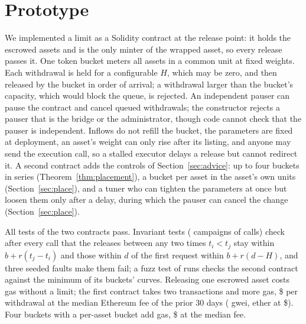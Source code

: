 \documentclass[conference,compsoc]{IEEEtran}
\numberwithin{equation}{section}
\theoremstyle{plain}
\theoremstyle{definition}
\theoremstyle{remark}
\begin{document}
\section{Prototype}\label{sec:prototype}

We implemented a limit as a Solidity contract at the release point: it holds the escrowed assets and is the only minter of the wrapped asset, so every release passes it. One token bucket meters all assets in a common unit at fixed weights. Each withdrawal is held for a configurable $H$, which may be zero, and then released by the bucket in order of arrival; a withdrawal larger than the bucket's capacity, which would block the queue, is rejected. An independent pauser can pause the contract and cancel queued withdrawals; the constructor rejects a pauser that is the bridge or the administrator, though code cannot check that the pauser is independent. Inflows do not refill the bucket, the parameters are fixed at deployment, an asset's weight can only rise after its listing, and anyone may send the execution call, so a stalled executor delays a release but cannot redirect it. A second contract adds the controls of Section~\ref{sec:advice}: up to four buckets in series (Theorem~\ref{thm:placement}), a bucket per asset in the asset's own units (Section~\ref{sec:place}), and a tuner who can tighten the parameters at once but loosen them only after a delay, during which the pauser can cancel the change (Section~\ref{sec:place}).

All \nTests{} tests of the two contracts pass. Invariant tests (\invRuns{} campaigns of \invDepth{} calls) check after every call that the releases between any two times $t_i < t_j$ stay within $b + r(t_j - t_i)$ and those within $d$ of the first request within $b + r(d - H)$, and three seeded faults make them fail; a fuzz test of \nFuzzRuns{} runs checks the second contract against the minimum of its buckets' curves. Releasing one escrowed asset costs \gasPlain{} gas without a limit; the first contract takes two transactions and \gasLimiterExtra{} more gas, \$\gasExtraUsd{} per withdrawal at the median Ethereum fee of the prior 30 days (\gasPriceGwei{} gwei, ether at \$\ethUsd{}). Four buckets with a per-asset bucket add \gasTunedExtra{} gas, \$\gasTunedExtraUsd{} at the median fee.
\end{document}
